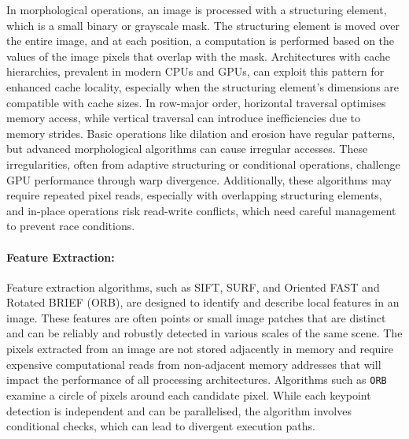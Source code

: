 In morphological operations, an image is processed with a structuring element, which is a small binary or grayscale mask. The structuring element is moved over the entire image, and at each position, a computation is performed based on the values of the image pixels that overlap with the mask. Architectures with cache hierarchies, prevalent in modern CPUs and GPUs, can exploit this pattern for enhanced cache locality, especially when the structuring element's dimensions are compatible with cache sizes. In row-major order, horizontal traversal optimises memory access, while vertical traversal can introduce inefficiencies due to memory strides. Basic operations like dilation and erosion have regular patterns, but advanced morphological algorithms can cause irregular accesses. These irregularities, often from adaptive structuring or conditional operations, challenge GPU performance through warp divergence. Additionally, these algorithms may require repeated pixel reads, especially with overlapping structuring elements, and in-place operations risk read-write conflicts, which need careful management to prevent race conditions.


\paragraph{Feature Extraction:} Feature extraction algorithms, such as SIFT\cite{Low99}, SURF\cite{Her06}, and Oriented FAST and Rotated BRIEF (ORB)\cite{ORB}, are designed to identify and describe local features in an image. These features are often points or small image patches that are distinct and can be reliably and robustly detected in various scales of the same scene. The pixels extracted from an image are not stored adjacently in memory and require expensive computational reads from non-adjacent memory addresses that will impact the performance of all processing architectures. Algorithms such as \texttt{ORB} examine a circle of pixels around each candidate pixel. While each keypoint detection is independent and can be parallelised, the algorithm involves conditional checks, which can lead to divergent execution paths.

